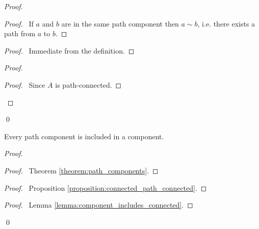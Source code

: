 \begin{proof}
    \pf
    \begin{proof}
        \pf\ If $a$ and $b$ are in the same path component then $a \sim b$,
        i.e. there exists a path from $a$ to $b$.
    \end{proof}
    \begin{proof}
        \pf\ Immediate from the definition.
    \end{proof}
    \begin{proof}
        \begin{proof}
            \pf\ Since $A$ is path-connected.
        \end{proof}
    \end{proof}
    \qed
\end{proof}

\begin{proposition}
    \label{proposition:path_component_sub_component}
    Every path component is included in a component.
\end{proposition}

\begin{proof}
    \pf
    \begin{proof}
        \pf\ Theorem \ref{theorem:path_components}.
    \end{proof}
    \begin{proof}
        \pf\ Proposition \ref{proposition:connected_path_connected}.
    \end{proof}
    \begin{proof}
        \pf\ Lemma \ref{lemma:component_includes_connected}.
    \end{proof}
    \qed
\end{proof}

